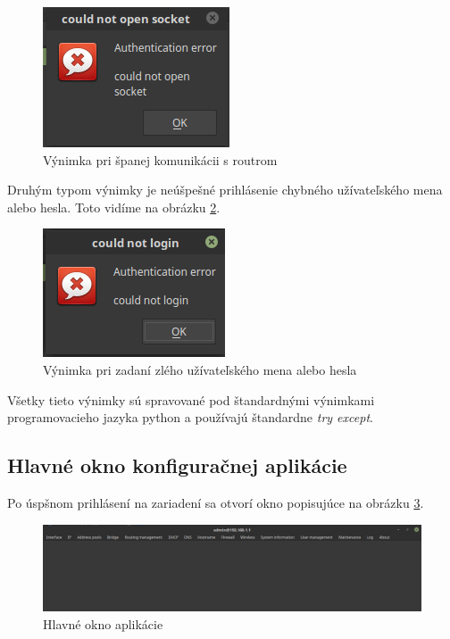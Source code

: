 \begin{figure}[H]
\centering
\includegraphics[scale=0.55]{../text/socket.png}
\caption{Výnimka pri španej komunikácii s routrom}
\label{fig:socket}
\end{figure}
Druhým typom výnimky je neúšpešné prihlásenie chybného užívateľského mena alebo hesla. Toto vidíme na obrázku \ref{fig:loginworong}.
\begin{figure}[H]
\centering
\includegraphics[scale=0.55]{../text/loginerror.png}
\caption{Výnimka pri zadaní zlého užívateľského mena alebo hesla}
\label{fig:loginworong}
\end{figure}
Všetky tieto výnimky sú spravované pod štandardnými výnimkami programovacieho jazyka python a používajú štandardne \textit{try except}.
\subsection{Hlavné okno konfiguračnej aplikácie}
Po úspšnom prihlásení na zariadení sa otvorí okno popisujúce na obrázku \ref{fig:loginokno}.
\begin{figure}[H]
\centering
\includegraphics[scale=0.35]{../text/loginokno.png}
\caption{Hlavné okno aplikácie}
\label{fig:loginokno}
\end{figure}
\newpage
